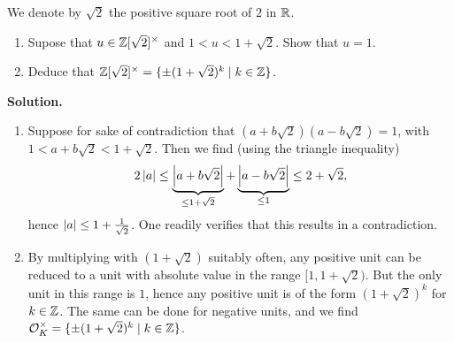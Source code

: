 \documentclass[a4paper,11pt]{article}
\begin{document}
We denote by $\sqrt 2$ the positive square root of $2$ in $\mathbb{R}$.
\begin{enumerate}
    \item Supose that $u \in \mathbb{Z}[\sqrt 2]^\times$ and $1 < u < 1 + \sqrt 2$. Show that
        $u = 1$. 
    \item Deduce that $\mathbb{Z}[\sqrt 2]^\times = \{\pm(1+\sqrt 2)^k \mid k \in \mathbb{Z}\}$.
\end{enumerate}
\textbf{Solution.}
\begin{enumerate}[wide, labelindent=0pt] 
    \item Suppose for sake of contradiction that $(a + b \sqrt 2)(a - b \sqrt
        2) = 1$, with $1 < a + b\sqrt 2 < 1 + \sqrt 2$. Then we find (using the
        triangle inequality) 
        \begin{equation*}
            2 \left\lvert a \right\rvert \leq \underbrace{\left\lvert a + b \sqrt 2 \right\rvert}_{\leq 1 + \sqrt 2} +
            \underbrace{\left\lvert a - b \sqrt 2 \right\rvert}_{\leq 1}
            \leq 2 + \sqrt 2,
        \end{equation*}
        hence $\left\lvert a \right\rvert \leq 1 + \frac 1{\sqrt 2}$. One readily verifies that this 
        results in a contradiction.
    \item By multiplying with $(1+\sqrt 2)$ suitably often, any positive unit can be
        reduced to a unit with absolute value in the range $[1, 1 + \sqrt 2)$.
        But the only unit in this range is $1$, hence any positive unit is of the 
        form $(1 + \sqrt 2)^k$ for $k \in \mathbb{Z}$. The same can be done for negative
        units, and we find $\mathcal{O}_K^\times = \{\pm (1 + \sqrt 2)^k \mid k \in \mathbb{Z}\}$.
\end{enumerate}

\contactend
\end{document}
